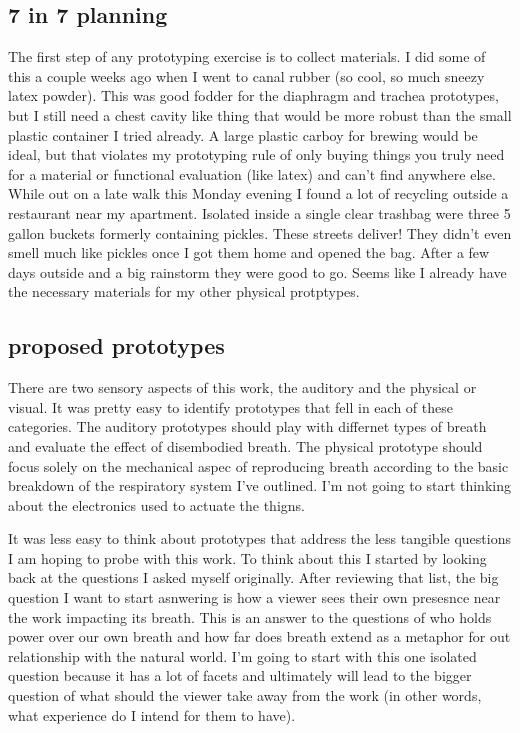 \documentclass[11pt]{report}
\begin{document}
\begin{itmemize}
\section*{7 in 7 planning}

The first step of any prototyping exercise is to collect materials. I did some of this a couple weeks ago when I went to canal rubber (so cool, so much sneezy latex powder). This was good fodder for the diaphragm and trachea prototypes, but I still need a chest cavity like thing that would be more robust than the small plastic container I tried already. A large plastic carboy for brewing would be ideal, but that violates my prototyping rule of only buying things you truly need for a material or functional evaluation (like latex) and can't find anywhere else. While out on a late walk this Monday evening I found a lot of recycling outside a restaurant near my apartment. Isolated inside a single clear trashbag were three 5 gallon buckets formerly containing pickles. These streets deliver! They didn't even smell much like pickles once I got them home and opened the bag. After a few days outside and a big rainstorm they were good to go. Seems like I already have the necessary materials for my other physical protptypes. 

\subsection*{proposed prototypes}

There are two sensory aspects of this work, the auditory and the physical or visual. It was pretty easy to identify prototypes that fell in each of these categories. The auditory prototypes should play with differnet types of breath and evaluate the effect of disembodied breath. The physical prototype should focus solely on the mechanical aspec of reproducing breath according to the basic breakdown of the respiratory system I've outlined. I'm not going to start thinking about the electronics used to actuate the thigns.

It was less easy to think about prototypes that address the less tangible questions I am hoping to probe with this work. To think about this I started by looking back at the questions I asked myself originally. After reviewing that list, the big question I want to start asnwering is how a viewer sees their own presesnce near the work impacting its breath. This is an answer to the questions of who holds power over our own breath and how far does breath extend as a metaphor for out relationship with the natural world. I'm going to start with this one isolated question because it has a lot of facets and ultimately will lead to the bigger question of what should the viewer take away from the work (in other words, what experience do I intend for them to have). 


\end{itmemize}
\end{document}
